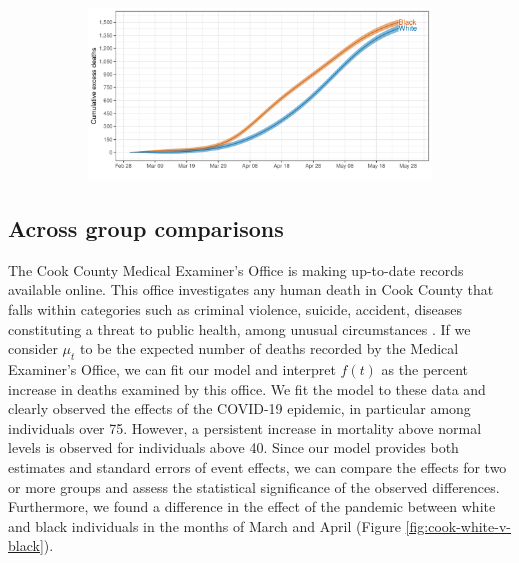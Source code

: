 \documentclass[11pt]{article}
\begin{document}
\begin{figure}[ht]
\begin{subfigure}[t]{0.49\linewidth}
		\caption{} 
		\label{fig:excess-flu-vs-covid}
	\end{subfigure}
	\hfill
	\begin{subfigure}[t]{0.49\linewidth}
		\centering
		\includegraphics[width=1\linewidth]{figs/figure-2d.pdf}
		\caption{} 
		\label{fig:excess-cook}
	\end{subfigure}
	\caption{}
	\label{fig:excess-deaths}
\end{figure}

\subsection{Across group comparisons}
\label{subsec:group-comparison}

The Cook County Medical Examiner's Office is making up-to-date records available online. This office investigates any human death in Cook County that falls within categories such as criminal violence, suicide, accident, diseases constituting a threat to public health, among unusual circumstances \cite{cookcovid19}. If we consider $\mu_t$ to be the expected number of deaths recorded by the Medical Examiner's Office, we can fit our model and interpret $f(t)$ as the percent increase in deaths examined by this office. We fit the model to these data and clearly observed the effects of the COVID-19 epidemic, in particular among individuals over 75. However, a persistent increase in mortality above normal levels is observed for individuals above 40. Since our model provides both estimates and standard errors of event effects, we can compare the effects for two or more groups and assess the statistical significance of the observed differences. Furthermore, we found a difference in the effect of the pandemic between white and black individuals in the months of March and April (Figure \ref{fig:cook-white-v-black}). 
\end{document}
